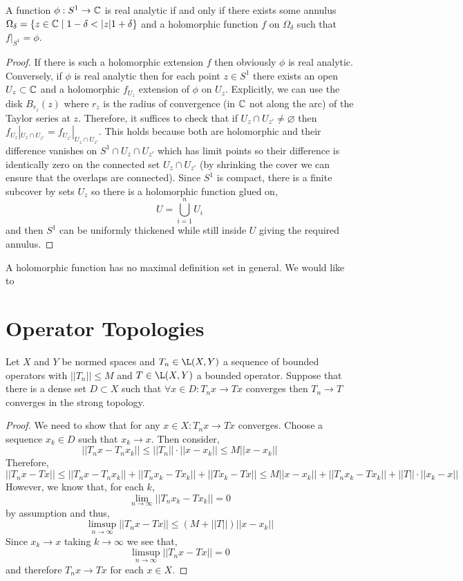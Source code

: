 \documentclass[12pt]{article}
\begin{document}
\begin{prop}
A function $\phi : S^1 \to \mathbb{C}$ is real analytic if and only if there exists some annulus $\Omega_\delta = \{ z \in \mathbb{C} \mid 1 - \delta < |z| 1 + \delta \}$ and a holomorphic function $f$ on $\Omega_\delta$ such that $f|_{S^1} = \phi$.
\end{prop}

\begin{proof}
If there is such a holomorphic extension $f$ then obviously $\phi$ is real analytic. Conversely, if $\phi$ is real analytic then for each point $z \in S^1$ there exists an open $U_z \subset \mathbb{C}$ and a holomorphic $f_{U_z}$ extension of $\phi$ on $U_z$. Explicitly, we can use the disk $B_{r_z}(z)$ where $r_z$ is the radius of convergence (in $\mathbb{C}$ not along the arc) of the Taylor series at $z$. Therefore, it suffices to check that if $U_z \cap U_{z'} \neq \varnothing$ then $f_{U_z} |_{U_z \cap U_{z'}} = f_{U_{z'}} |_{U_z \cap U_{z'}}$. This holds because both are holomorphic and their difference vanishes on $S^1 \cap U_z \cap U_{z'}$ which has limit points so their difference is identically zero on the connected set $U_z \cap U_{z'}$ (by shrinking the cover we can ensure that the overlaps are connected). Since $S^1$ is compact, there is a finite subcover by sets $U_z$ so there is a holomorphic function glued on,
\[ U = \bigcup_{i = 1}^n U_i \]
and then $S^1$ can be uniformly thickened while still inside $U$ giving the required annulus. 
\end{proof}

\begin{rmk}
A holomorphic function has no maximal definition set in general. We would like to 
\end{rmk}

\section{Operator Topologies}

\begin{prop}
Let $X$ and $Y$ be normed spaces and $T_n \in \L(X, Y)$ a sequence of bounded operators with $|| T_n || \le M$ and $T \in \L(X, Y)$ a bounded operator. Suppose that there is a dense set $D \subset X$ such that $\forall x \in D : T_n x \to T x$ converges then $T_n \to T$ converges in the strong topology.
\end{prop}

\begin{proof}
We need to show that for any $x \in X : T_n x \to T x$ converges. Choose a sequence $x_k \in D$ such that $x_k \to x$. Then consider,
\[ || T_n x - T_n x_k || \le || T_n || \cdot || x - x_k || \le M || x - x_k || \]
Therefore, 
\[ || T_n x - T x || \le || T_n x - T_n x_k || + || T_n x_k - T x_k || + || T x_k - T x || \le M || x - x_k || + || T_n x_k - T x_k || + || T || \cdot || x_k - x || \]
However, we know that, for each $k$,
\[ \lim_{n \to \infty} || T_n x_k - T x_k || = 0 \]
by assumption and thus,
\[ \limsup_{n \to \infty} || T_n x - T x || \le (M + || T ||) || x - x_k || \]
Since $x_k \to x$ taking $k \to \infty$ we see that,
\[ \limsup_{n \to \infty} || T_n x - T x || = 0 \]
and therefore $T_n x \to T x$ for each $x \in X$.
\end{proof}
\end{document}
